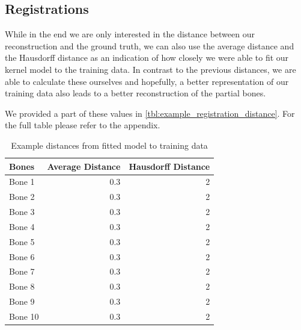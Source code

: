 
\subsection{Registrations}
\label{subsec:registrresults}
While in the end we are only interested in the distance between our reconstruction and the ground truth, we can also use the average distance and the Hausdorff distance as an indication of how closely we were able to fit our kernel model to the training data. 
In contrast to the previous distances, we are able to calculate these ourselves and hopefully, a better representation of our training data also leads to a better reconstruction of the partial bones. 

We provided a part of these values in \autoref{tbl:example_registration_distance}. For the full table please refer to the appendix.

\begin{table}
\centering
\caption{Example distances from fitted model to training data}
\label{tbl:example_registration_distance}
\begin{tabular}{lrr}
\toprule
\textbf{Bones} &
Average Distance &
Hausdorff Distance \\
\midrule
Bone 1& 0.3 & 2 \\
Bone 2& 0.3 & 2 \\
Bone 3& 0.3 & 2 \\
Bone 4& 0.3 & 2 \\
Bone 5& 0.3 & 2 \\
Bone 6& 0.3 & 2 \\
Bone 7& 0.3 & 2 \\
Bone 8& 0.3 & 2 \\
Bone 9& 0.3 & 2 \\
Bone 10& 0.3 & 2 \\
\bottomrule
\end{tabular}
\end{table}

